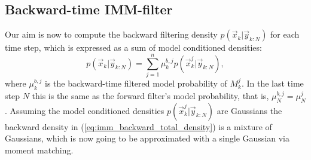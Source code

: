 \subsection*{Backward-time IMM-filter}

Our aim is now to compute the backward filtering density
$p(\vec{x}_k|\vec{y}_{k:N})$ for each time step, which is expressed as
a sum of model conditioned densities:
% 
\begin{equation}
  p(\vec{x}_k|\vec{y}_{k:N}) = \sum_{j=1}^{n} \mu_k^{b,j}
p(\vec{x}_k^j|\vec{y}_{k:N}), \label{eq:imm_backward_total_density}
\end{equation}
% 
where $\mu_k^{b,j}$ is the backward-time filtered model probability of
$M_k^j$. In the last time step $N$ this is the same as the forward
filter's model probability, that is, $\mu_N^{b,j} =
\mu_N^{j}$. Assuming the model conditioned densities
$p(\vec{x}_k^j|\vec{y}_{k:N})$ are Gaussians the backward density in
(\ref{eq:imm_backward_total_density}) is a mixture of Gaussians, which
is now going to be approximated with a single Gaussian via moment
matching.

